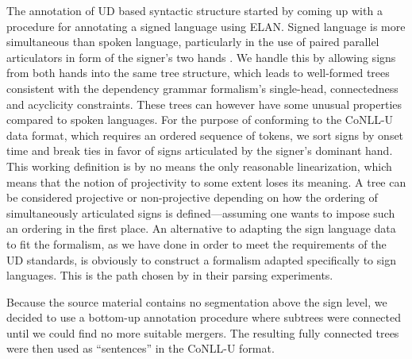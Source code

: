 \documentclass[11pt]{article}
\begin{document}
The annotation of UD based syntactic structure started by coming up with a procedure for annotating a signed language using ELAN. Signed language is more simultaneous than spoken language, particularly in the use of paired parallel articulators in form of the signer's two hands \cite{Vermeerbergen2007simultaneity}.
We handle this by allowing signs from both hands into the same tree structure,
which leads to well-formed trees consistent with the dependency grammar
formalism's single-head, connectedness and acyclicity constraints.
These trees can however have some unusual properties compared to spoken
languages.
For the purpose of conforming to the CoNLL-U data format,
which requires an ordered sequence of tokens, we sort
signs by onset time and break ties in favor of signs articulated by the
signer's dominant hand.
This working definition is by no means the only reasonable linearization,
which means that the notion of projectivity to some extent loses its meaning.
A tree can be considered projective or non-projective depending on how the
ordering of simultaneously articulated signs is defined---assuming one wants
to impose such an ordering in the first place.
An alternative to adapting the sign language data to fit the formalism,
as we have done in order to meet the requirements of the UD standards,
is obviously to construct a formalism adapted specifically to sign languages.
This is the path chosen by  in their parsing
experiments.

Because the source material contains no segmentation above the sign level,
we decided to use a bottom-up annotation procedure where subtrees were
connected until we could find no more suitable mergers. The resulting fully
connected trees were then used as ``sentences'' in the CoNLL-U format.
\end{document}
